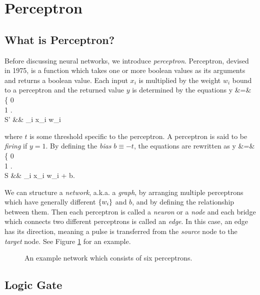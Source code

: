 \documentclass{article}
\theoremstyle{definition}
\newcommand{\fig}[1]{Figure \ref{fig:#1}}
\begin{document}

\newpage
\section{Perceptron}

\subsection{What is Perceptron?} \label{section:2.1}

Before discussing neural networks, we introduce {\it perceptron}. Perceptron, devised in 1975, is a function which takes one or more boolean values as its arguments and returns a boolean value. Each input $x_i$ is multiplied by the weight $w_i$ bound to a perceptron and the returned value $y$ is determined by the equations
\begineq
y &=& \left\{  0  \\ 1  \edarray \right.  \\
S' &\equiv& \sum _i x_i w_i 
\edeq

where $t$ is some threshold specific to the perceptron. A perceptron is said to be {\it firing} if $y = 1$. By defining the {\it bias} $b \equiv -t$, the equations are rewritten as
\begineq
y &=& \left\{  0  \\ 1  \edarray \right.  \\
S &\equiv& \sum _i x_i w_i + b. 
\edeq

We can structure a {\it network}, a.k.a. a {\it graph}, by arranging multiple perceptrons which have generally different $\left\{ w_i \right\}$ and $b$, and by defining the relationship between them. Then each perceptron is called a {\it neuron} or a {\it node} and each bridge which connects two different perceptrons is called an {\it edge}. In this case, an edge has its direction, meaning a pulse is transferred from the {\it source} node to the {\it target} node. See \fig{2.1} for an example.

\begin{figure}[H]
    \centering
    \begin{subfigure}[H]{1.0\textwidth}
	\end{subfigure}
    \caption{An example network which consists of six perceptrons.}
    \label{fig:2.1}
\end{figure}

\subsection{Logic Gate}
\end{document}
